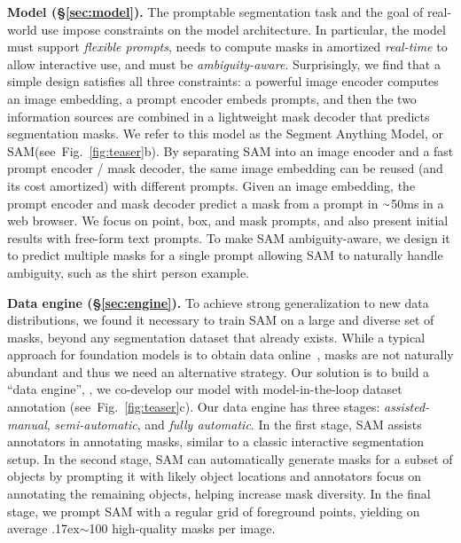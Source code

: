 \documentclass[10pt,twocolumn,letterpaper]{article}
\renewcommand{\paragraph}[1]{\vspace{1.25mm}\noindent\textbf{#1}}
\newcommand{\app}{\raise.17ex\hbox{$\scriptstyle\sim$}}
\newcommand{\sam}{SAM\xspace}
\newcommand{\fig}[1]{Fig.~\ref{#1}}
\begin{document}
\paragraph{Model (\S\ref{sec:model}).} The promptable segmentation task and the goal of real-world use impose constraints on the model architecture. In particular, the model must support \emph{flexible prompts}, needs to compute masks in amortized \emph{real-time} to allow interactive use, and must be \emph{ambiguity-aware}. Surprisingly, we find that a simple design satisfies all three constraints: a powerful image encoder computes an image embedding, a prompt encoder embeds prompts, and then the two information sources are combined in a lightweight mask decoder that predicts segmentation masks. We refer to this model as the Segment Anything Model, or \sam (see~\fig{fig:teaser}{\color{linkcolor}b}). By separating \sam into an image encoder and a fast prompt encoder / mask decoder, the same image embedding can be reused (and its cost amortized) with different prompts. Given an image embedding, the prompt encoder and mask decoder predict a mask from a prompt in $\app$50ms in a web browser. We focus on point, box, and mask prompts, and also present initial results with free-form text prompts. To make \sam ambiguity-aware, we design it to predict multiple masks for a single prompt allowing \sam to naturally handle ambiguity, such as the shirt \vs person example.

\paragraph{Data engine (\S\ref{sec:engine}).} To achieve strong generalization to new data distributions, we found it necessary to train \sam on a large and diverse set of masks, beyond any segmentation dataset that already exists. While a typical approach for foundation models is to obtain data online~\cite{Radford2021}, masks are not naturally abundant and thus we need an alternative strategy. Our solution is to build a ``data engine'', \ie, we co-develop our model with model-in-the-loop dataset annotation (see~\fig{fig:teaser}{\color{linkcolor}c}). Our data engine has three stages: \emph{assisted-manual}, \emph{semi-automatic}, and \emph{fully automatic}. In the first stage, \sam assists annotators in annotating masks, similar to a classic interactive segmentation setup. In the second stage, \sam can automatically generate masks for a subset of objects by prompting it with likely object locations and annotators focus on annotating the remaining objects, helping increase mask diversity. In the final stage, we prompt \sam with a regular grid of foreground points, yielding on average \app100 high-quality masks per image.
\end{document}
